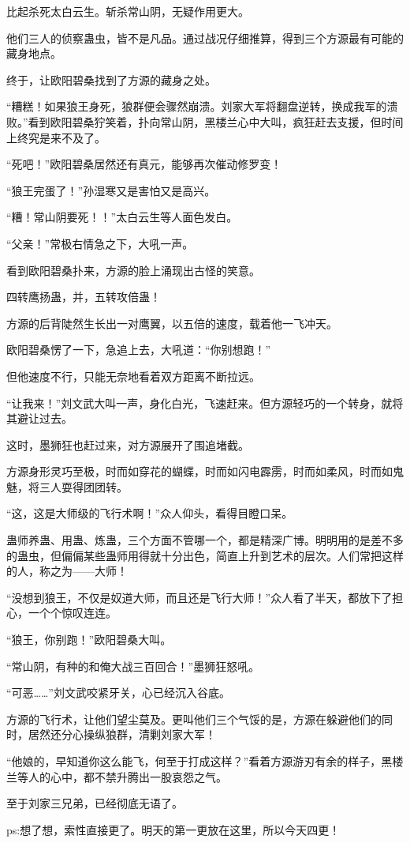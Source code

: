 \begin{this_body}
比起杀死太白云生。斩杀常山阴，无疑作用更大。

他们三人的侦察蛊虫，皆不是凡品。通过战况仔细推算，得到三个方源最有可能的藏身地点。

终于，让欧阳碧桑找到了方源的藏身之处。

“糟糕！如果狼王身死，狼群便会骤然崩溃。刘家大军将翻盘逆转，换成我军的溃败。”看到欧阳碧桑狞笑着，扑向常山阴，黑楼兰心中大叫，疯狂赶去支援，但时间上终究是来不及了。

“死吧！”欧阳碧桑居然还有真元，能够再次催动修罗变！

“狼王完蛋了！”孙湿寒又是害怕又是高兴。

“糟！常山阴要死！！”太白云生等人面色发白。

“父亲！”常极右情急之下，大吼一声。

看到欧阳碧桑扑来，方源的脸上涌现出古怪的笑意。

四转鹰扬蛊，并，五转攻倍蛊！

方源的后背陡然生长出一对鹰翼，以五倍的速度，载着他一飞冲天。

欧阳碧桑愣了一下，急追上去，大吼道：“你别想跑！”

但他速度不行，只能无奈地看着双方距离不断拉远。

“让我来！”刘文武大叫一声，身化白光，飞速赶来。但方源轻巧的一个转身，就将其避让过去。

这时，墨狮狂也赶过来，对方源展开了围追堵截。

方源身形灵巧至极，时而如穿花的蝴蝶，时而如闪电霹雳，时而如柔风，时而如鬼魅，将三人耍得团团转。

“这，这是大师级的飞行术啊！”众人仰头，看得目瞪口呆。

蛊师养蛊、用蛊、炼蛊，三个方面不管哪一个，都是精深广博。明明用的是差不多的蛊虫，但偏偏某些蛊师用得就十分出色，简直上升到艺术的层次。人们常把这样的人，称之为——大师！

“没想到狼王，不仅是奴道大师，而且还是飞行大师！”众人看了半天，都放下了担心，一个个惊叹连连。

“狼王，你别跑！”欧阳碧桑大叫。

“常山阴，有种的和俺大战三百回合！”墨狮狂怒吼。

“可恶……”刘文武咬紧牙关，心已经沉入谷底。

方源的飞行术，让他们望尘莫及。更叫他们三个气馁的是，方源在躲避他们的同时，居然还分心操纵狼群，清剿刘家大军！

“他娘的，早知道你这么能飞，何至于打成这样？”看着方源游刃有余的样子，黑楼兰等人的心中，都不禁升腾出一股哀怨之气。

至于刘家三兄弟，已经彻底无语了。

ps:想了想，索性直接更了。明天的第一更放在这里，所以今天四更！

\end{this_body}

